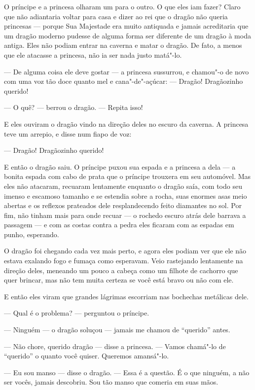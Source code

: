 O príncipe e a princesa olharam um para o outro. O que eles iam fazer?
Claro que não adiantaria voltar para casa e dizer ao rei que o dragão
não queria princesas --- porque Sua Majestade era muito antiquada e
jamais acreditaria  que um dragão moderno pudesse de alguma forma ser
diferente de um dragão à moda antiga. Eles não podiam entrar na
caverna e matar o dragão. De fato, a menos que ele atacasse a
princesa, não ia ser nada justo matá"-lo.

--- De alguma coisa ele deve gostar --- a princesa sussurrou, e chamou"-o
de novo com uma voz tão doce quanto mel e cana"-de"-açúcar: --- Dragão!
Dragãozinho querido!

--- O quê? --- berrou o dragão. --- Repita isso!

E eles ouviram o dragão vindo na direção deles no escuro da caverna. A
princesa teve um arrepio, e disse num fiapo de voz:

--- Dragão! Dragãozinho querido!

E então o dragão saiu. O príncipe puxou sua espada e a princesa a dela
--- a bonita espada com cabo de prata que o príncipe trouxera em seu
automóvel. Mas eles não atacaram, recuaram lentamente enquanto o
dragão saía, com todo seu imenso e escamoso tamanho e se estendia
sobre a rocha, suas enormes asas meio abertas e os reflexos prateados		%
dele resplandecendo feito diamantes no sol. Por fim, não tinham mais
para onde recuar --- o rochedo escuro atrás dele barrava a passagem --- e
com as costas contra a pedra eles ficaram com as espadas em punho,
esperando.

O dragão foi chegando cada vez mais perto, e agora eles podiam ver que
ele não estava exalando fogo e fumaça como esperavam. Veio rastejando
lentamente na direção deles, meneando um pouco a cabeça como um
filhote de cachorro que quer brincar, mas não tem muita certeza se
você está bravo ou não com ele.

E então eles viram que grandes lágrimas escorriam nas bochechas
metálicas dele.

--- Qual é o problema? --- perguntou o príncipe.

--- Ninguém --- o dragão soluçou --- jamais me chamou de “querido” antes.

--- Não chore, querido dragão --- disse a princesa. --- Vamos chamá"-lo de
“querido” o quanto você quiser. Queremos amansá"-lo.

--- Eu sou manso --- disse o dragão. --- Essa é a questão. É o que ninguém, a
não ser vocês, jamais descobriu. Sou tão manso que comeria em suas
mãos.


